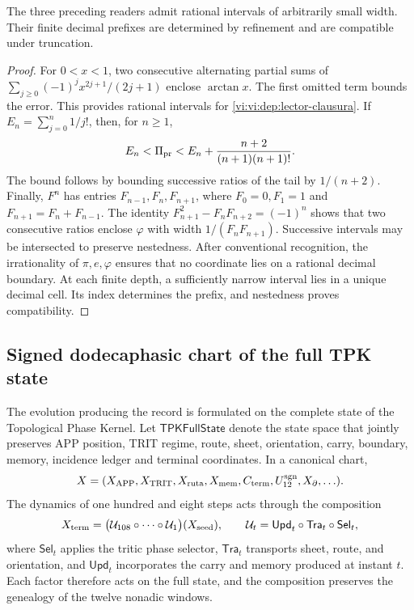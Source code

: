 \begin{proposition}
\label{vi:vi:dep:prefijos}
The three preceding readers admit rational intervals of arbitrarily
small width. Their finite decimal prefixes are determined by
refinement and are compatible under truncation.
\end{proposition}
\begin{proof}
For \(0<x<1\), two consecutive alternating partial sums of
\(\sum_{j\ge0}(-1)^jx^{2j+1}/(2j+1)\) enclose \(\arctan x\).
The first omitted term bounds the error. This provides rational
intervals for \eqref{vi:vi:dep:lector-clausura}.
If \(E_n=\sum_{j=0}^n1/j!\), then, for \(n\ge1\),
\[
 E_n<\Pi_{\rm pr}<E_n+
 \frac{n+2}{(n+1)(n+1)!}.
\]
The bound follows by bounding successive ratios of the tail by
\(1/(n+2)\). Finally, \(F^n\) has entries
\(F_{n-1},F_n,F_{n+1}\), where \(F_0=0,F_1=1\) and
\(F_{n+1}=F_n+F_{n-1}\). The identity
\(F_{n+1}^2-F_nF_{n+2}=(-1)^n\) shows that two consecutive ratios
enclose \(\varphi\) with width \(1/(F_nF_{n+1})\).
Successive intervals may be intersected to preserve
nestedness. After conventional recognition, the irrationality of
\(\pi,e,\varphi\) ensures that no coordinate lies on a rational
decimal boundary. At each finite depth, a sufficiently
narrow interval lies in a unique decimal cell. Its index
determines the prefix, and nestedness proves compatibility.
\end{proof}

\subsection{Signed dodecaphasic chart of the full TPK state}
\label{vi:vi:dep:estado-pleno}

The evolution producing the record is formulated on the complete state of the
Topological Phase Kernel. Let
\(\mathsf{TPKFullState}\) denote the state space that jointly preserves
APP position, TRIT regime, route, sheet, orientation, carry, boundary,
memory, incidence ledger and terminal coordinates. In a canonical chart,
\[
 X=(X_{\rm APP},X_{\rm TRIT},X_{\rm ruta},X_{\rm mem},
       C_{\rm term},U_{12}^{\rm sgn},X_{\partial},\ldots).
\]
The dynamics of one hundred and eight steps acts through the composition
\begin{equation}
 X_{\rm term}
 =\bigl(\mathcal U_{108}\circ\cdots\circ\mathcal U_1\bigr)(X_{\rm seed}),
 \qquad
 \mathcal U_t=\mathsf{Upd}_t\circ\mathsf{Tra}_t\circ\mathsf{Sel}_t,
 \label{vi:vi:dep:estado-terminal-108}
\end{equation}
where \(\mathsf{Sel}_t\) applies the tritic phase selector,
\(\mathsf{Tra}_t\) transports sheet, route, and orientation, and
\(\mathsf{Upd}_t\) incorporates the carry and memory produced at
instant \(t\). Each factor therefore acts on the full state, and the
composition preserves the genealogy of the twelve nonadic windows.


